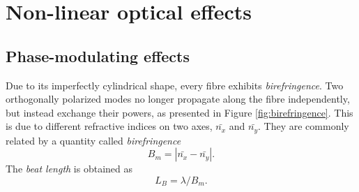 \documentclass{standalone}
\begin{document}
\section{Non-linear optical effects}

\subsection{Phase-modulating effects}

Due to its imperfectly cylindrical shape, every fibre exhibits \textit{birefringence}. Two orthogonally polarized modes no longer propagate along the fibre independently, but instead exchange their powers, as presented in Figure \ref{fig:birefringence}.
This is due to different refractive indices on two axes, $\bar{n_x}$ and $\bar{n_y}$. They are commonly related by a quantity called \textit{birefringence}
\begin{equation}
B_m = \left| \bar{n_x} - \bar{n_y} \right| \textrm{.}
\end{equation}
The \textit{beat length} is obtained as
\begin{equation}
L_B = \lambda / B_m \textrm{.}
\end{equation}
\end{document}
